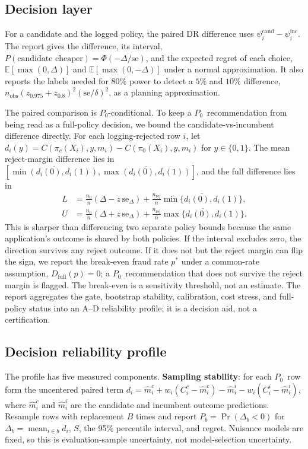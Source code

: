\documentclass[conference]{IEEEtran}
\newcommand{\Pzero}{\ensuremath{P_0}}
\begin{document}
\subsection{Decision layer}
For a candidate and the logged policy, the paired DR difference uses $\psi_i^{\text{cand}}-\psi_i^{\text{inc}}$. The report gives the difference, its interval, $P(\text{candidate cheaper})=\Phi(-\Delta/\mathrm{se})$, and the expected regret of each choice, $\mathbb{E}[\max(0,\Delta)]$ and $\mathbb{E}[\max(0,-\Delta)]$ under a normal approximation. It also reports the labels needed for $80\%$ power to detect a $5\%$ and $10\%$ difference, $n_{\text{obs}}(z_{0.975}+z_{0.8})^2(\mathrm{se}/\delta)^2$, as a planning approximation.

The paired comparison is \Pzero-conditional. To keep a \Pzero\ recommendation from being read as a full-policy decision, we bound the candidate-vs-incumbent difference directly. For each logging-rejected row $i$, let $d_i(y)=C(\pi_c(X_i),y,m_i)-C(\pi_0(X_i),y,m_i)$ for $y\in\{0,1\}$. The mean reject-margin difference lies in $[\overline{\min(d_i(0),d_i(1))},\overline{\max(d_i(0),d_i(1))}]$, and the full difference lies in
\begin{equation}
\begin{aligned}
L &= \frac{n_0}{n}\left(\Delta - z\,\mathrm{se}_\Delta\right)
+\frac{n_{\text{rej}}}{n}\overline{\min\{d_i(0),d_i(1)\}},\\
U &= \frac{n_0}{n}\left(\Delta + z\,\mathrm{se}_\Delta\right)
+\frac{n_{\text{rej}}}{n}\overline{\max\{d_i(0),d_i(1)\}}.
\end{aligned}
\end{equation}
This is sharper than differencing two separate policy bounds because the same application's outcome is shared by both policies. If the interval excludes zero, the direction survives any reject outcome. If it does not but the reject margin can flip the sign, we report the break-even fraud rate $p^\ast$ under a common-rate assumption, $D_{\text{full}}(p)=0$; a \Pzero\ recommendation that does not survive the reject margin is flagged. The break-even is a sensitivity threshold, not an estimate. The report aggregates the gate, bootstrap stability, calibration, cost stress, and full-policy status into an A--D reliability profile; it is a decision aid, not a certification.

\subsection{Decision reliability profile}
The profile has five measured components. \textbf{Sampling stability}: for each \Pzero\ row form the uncentered paired term $d_i=\hat m_i^{c}+w_i(C_i^{c}-\hat m_i^{c})-\hat m_i^{i}-w_i(C_i^{i}-\hat m_i^{i})$, where $\hat m_i^{c}$ and $\hat m_i^{i}$ are the candidate and incumbent outcome predictions. Resample rows with replacement $B$ times and report $P_b=\Pr(\Delta_b<0)$ for $\Delta_b=\operatorname{mean}_{i\in b}d_i$, $S$, the 95\% percentile interval, and regret. Nuisance models are fixed, so this is evaluation-sample uncertainty, not model-selection uncertainty.
\end{document}

